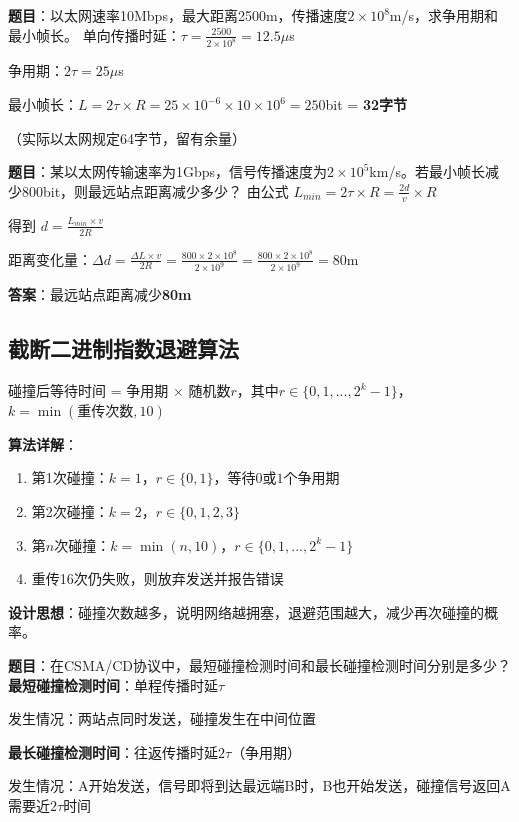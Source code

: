 \documentclass[12pt,a4paper,openany]{ctexbook}
\begin{document}
\begin{examplebox}
\textbf{题目}：以太网速率10Mbps，最大距离2500m，传播速度$2\times10^8$m/s，求争用期和最小帧长。
\tcblower
单向传播时延：$\tau = \frac{2500}{2\times10^8} = 12.5\mu$s

争用期：$2\tau = 25\mu$s

最小帧长：$L = 2\tau \times R = 25\times10^{-6} \times 10\times10^6 = 250$bit = \textbf{32字节}

（实际以太网规定64字节，留有余量）
\end{examplebox}

\begin{examplebox}[例题3.4b 最小帧长与距离关系]
\textbf{题目}：某以太网传输速率为1Gbps，信号传播速度为$2\times10^5$km/s。若最小帧长减少800bit，则最远站点距离减少多少？
\tcblower
由公式 $L_{min} = 2\tau \times R = \frac{2d}{v} \times R$

得到 $d = \frac{L_{min} \times v}{2R}$

距离变化量：$\Delta d = \frac{\Delta L \times v}{2R} = \frac{800 \times 2\times10^8}{2 \times 10^9} = \frac{800 \times 2\times10^8}{2\times10^9} = 80$m

\textbf{答案}：最远站点距离减少\textbf{80m}
\end{examplebox}

\subsection{截断二进制指数退避算法}
碰撞后等待时间 = 争用期 $\times$ 随机数$r$，其中$r \in \{0,1,...,2^k-1\}$，$k=\min(\text{重传次数},10)$

\textbf{算法详解}：
\begin{enumerate}[leftmargin=2em,itemsep=0pt]
    \item 第1次碰撞：$k=1$，$r \in \{0,1\}$，等待$0$或$1$个争用期
    \item 第2次碰撞：$k=2$，$r \in \{0,1,2,3\}$
    \item 第$n$次碰撞：$k=\min(n,10)$，$r \in \{0,1,...,2^k-1\}$
    \item 重传16次仍失败，则放弃发送并报告错误
\end{enumerate}

\textbf{设计思想}：碰撞次数越多，说明网络越拥塞，退避范围越大，减少再次碰撞的概率。

\begin{examplebox}[例题3.4c 碰撞检测时间]
\textbf{题目}：在CSMA/CD协议中，最短碰撞检测时间和最长碰撞检测时间分别是多少？
\tcblower
\textbf{最短碰撞检测时间}：单程传播时延$\tau$

发生情况：两站点同时发送，碰撞发生在中间位置

\textbf{最长碰撞检测时间}：往返传播时延$2\tau$（争用期）

发生情况：A开始发送，信号即将到达最远端B时，B也开始发送，碰撞信号返回A需要近$2\tau$时间
\end{examplebox}
\end{document}
